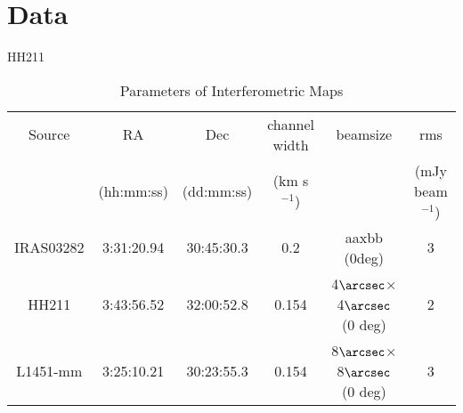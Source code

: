 \section{Data}

HH211

\cite{Tanner_2010}
\cite{Pineda_2011}
\cite{Tobin_2011}

\begin{table} 
\caption{Parameters of Interferometric Maps}
    \begin{tabular}{ c c c c c c }
        Source & RA & Dec & channel width & beamsize & rms \\ 
         & (hh:mm:ss) & (dd:mm:ss) & (km s$^{-1}$) &  & (mJy beam$^{-1}$) \\ 
        IRAS03282 & 3:31:20.94 & 30:45:30.3 & 0.2 & aaxbb (0deg) & 3 \\ 
        HH211 & 3:43:56.52 & 32:00:52.8 & 0.154 & 4$\arcsec$$\times$4$\arcsec$ (0 deg) & 2 \\ 
        L1451-mm & 3:25:10.21 & 30:23:55.3 & 0.154 & 8$\arcsec$$\times$8$\arcsec$ (0 deg) & 3 \\ 
    \end{tabular} 
\end{table}
  
  